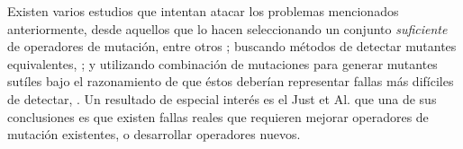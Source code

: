 Existen varios estudios que intentan atacar los problemas mencionados anteriormente, desde aquellos que lo hacen seleccionando un conjunto \emph{suficiente} de operadores de mutaci\'on, entre otros \cite{bibliography.mutation.selection.Offutt96, bibliography.mutation.selection.ASN2008}; buscando m\'etodos de detectar mutantes equivalentes, \cite{biblography.mutation.evaluation.equivalent.Grun+09, biblography.mutation.evaluation.equivalent.Schuler+10, biblography.mutation.evaluation.equivalent.Schuler+13, biblography.mutation.evaluation.equivalent.Just+13}; y utilizando combinaci\'on de mutaciones para generar mutantes sut\'iles bajo el razonamiento de que \'estos deber\'ian representar fallas m\'as dif\'iciles de detectar, \cite{bibliography.mutation.highorder.Jia+08, bibliography.mutation.highorder.Jia+09, bibliography.mutation.highorder.Harman+11}. Un resultado de especial inter\'es es el Just et Al. \cite{bibliography.mutation.evaluation.valid-substitute} que una de sus conclusiones es que existen fallas reales que requieren mejorar operadores de mutaci\'on existentes, o desarrollar operadores nuevos.








